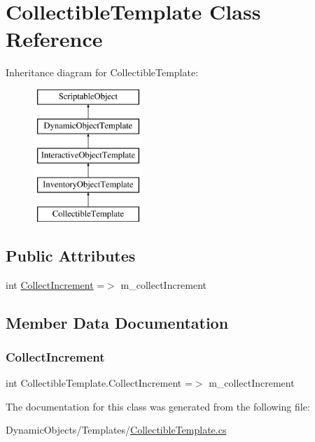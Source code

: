 \hypertarget{class_collectible_template}{}\section{Collectible\+Template Class Reference}
\label{class_collectible_template}
Inheritance diagram for Collectible\+Template\+:\begin{figure}[H]
\begin{center}
\leavevmode
\includegraphics[height=5.000000cm]{class_collectible_template}
\end{center}
\end{figure}
\subsection*{Public Attributes}
\begin{DoxyCompactItemize}
\item 
int \mbox{\hyperlink{class_collectible_template_ad52ca65b002a25bf7d67886e78cc198f}{Collect\+Increment}} =$>$ m\+\_\+collect\+Increment
\end{DoxyCompactItemize}


\subsection{Member Data Documentation}
\mbox{\label{class_collectible_template_ad52ca65b002a25bf7d67886e78cc198f}} 
\subsubsection{\texorpdfstring{Collect\+Increment}{CollectIncrement}}
{\footnotesize\ttfamily int Collectible\+Template.\+Collect\+Increment =$>$ m\+\_\+collect\+Increment}



The documentation for this class was generated from the following file\+:\begin{DoxyCompactItemize}
\item 
Dynamic\+Objects/\+Templates/\mbox{\hyperlink{_collectible_template_8cs}{Collectible\+Template.\+cs}}\end{DoxyCompactItemize}
